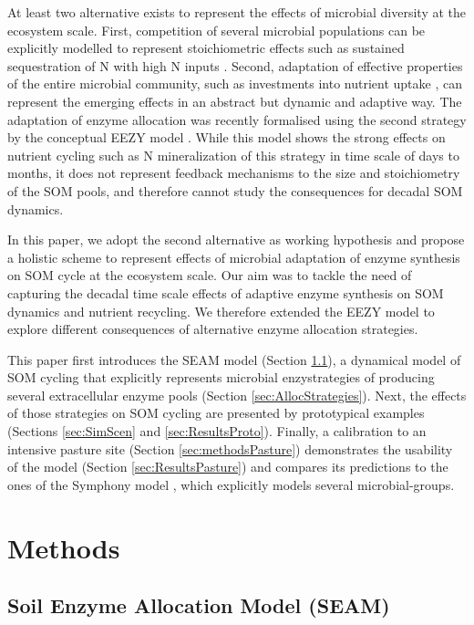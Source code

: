 At least two alternative exists to represent the effects of microbial diversity
at the ecosystem scale. First, competition of several microbial populations can
be explicitly modelled to represent stoichiometric effects such as sustained
sequestration of N with high N inputs \citep{Perveen14}. Second, adaptation of
effective properties of the entire microbial community, such as investments into
nutrient uptake \citep{Rastetter97, Rastetter11}, can represent the emerging
effects in an abstract but dynamic and adaptive way. The adaptation of enzyme
allocation was recently formalised using the second strategy by the conceptual
EEZY model \citep{Moorhead12}.
While this model shows the strong effects on nutrient cycling such as N
mineralization of this strategy in time scale of days to months, it does not
represent feedback mechanisms to the size and stoichiometry of the SOM pools,
and therefore cannot study the consequences for decadal SOM dynamics.

In this paper, we adopt the second alternative as working hypothesis and propose
a holistic scheme to represent effects of microbial adaptation of enzyme
synthesis on SOM cycle at the ecosystem scale. Our aim was to tackle the need
of capturing the decadal time scale effects of adaptive enzyme synthesis on 
SOM dynamics and nutrient recycling. We therefore extended the EEZY model to
explore different consequences of alternative enzyme allocation strategies.

This paper first introduces the SEAM model (Section \ref{sec:SEAM}), a dynamical
model of SOM cycling that explicitly represents microbial enzystrategies of
producing several extracellular enzyme pools (Section
\ref{sec:AllocStrategies}). Next, the effects of those strategies on SOM cycling
are presented by prototypical examples (Sections \ref{sec:SimScen} and
\ref{sec:ResultsProto}).
Finally, a calibration to an intensive pasture site (Section
\ref{sec:methodsPasture}) demonstrates the usability of the model (Section
\ref{sec:ResultsPasture}) and compares its predictions to the ones of the
Symphony model \citep{Perveen14}, which explicitly models several
microbial-groups. 

\section{Methods}
\subsection{Soil Enzyme Allocation Model (SEAM)}
\label{sec:SEAM}

